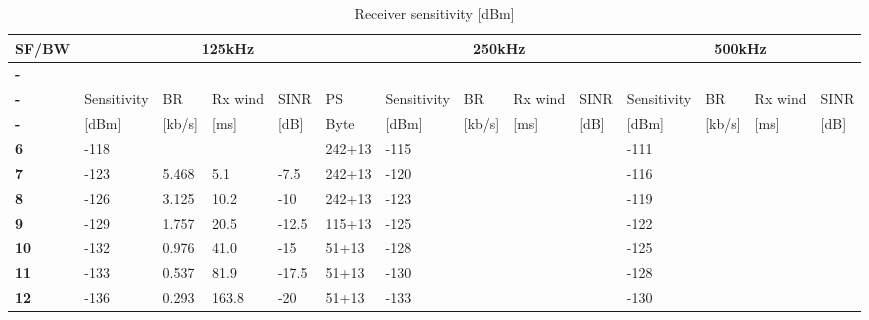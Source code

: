 \begin{table}[h!]
\scriptsize
	\begin{tabular}{l|lllll|llll|llll}
	\textbf{\ac{SF}/\ac{BW}} & \multicolumn{5}{c}{\textbf{125kHz}}                   								& \multicolumn{4}{c}{\textbf{250kHz} }             						& \multicolumn{4}{c}{\textbf{500kHz} }             						 \\\hline
	\textbf{-}     & \cite{varsier_capacity_2017}       & 				  & \cite{loraaliance}	& \cite{lorasite} 	& 			& 			                         & 			 & 			& 			& 			                         & 			 &   		&			 \\
	\textbf{-}     & Sensitivity		                & \ac{BR}		  & Rx wind				& \ac{SINR} 		& \ac{PS}  	& Sensitivity                        & \ac{BR}	 & Rx wind  & \ac{SINR}	& Sensitivity                        & \ac{BR}	 & Rx wind  & \ac{SINR}	 \\
	\textbf{-}     & [dBm]      			            & [kb/s] 		  & [ms]				& [dB] 				& Byte 		& [dBm]      			             & [kb/s] 	 & [ms]		& [dB] 		& [dBm]      			             & [kb/s] 	 & [ms]		& [dB] 		 \\
	\textbf{6}     & -118                               &                 &   					&					& 242+13	& -115                               &           &   		&			& -111                               &           &   		&			 \\
	\textbf{7}     & -123                               & 5.468           & 5.1  				& -7.5				& 242+13	& -120                               &           &   		&			& -116                               &           &   		&			 \\
	\textbf{8}     & -126                               & 3.125           & 10.2  				& -10				& 242+13	& -123                               &           &   		&			& -119                               &           &   		&			 \\
	\textbf{9}     & -129                               & 1.757           & 20.5  				& -12.5				& 115+13	& -125                               &           &   		&			& -122                               &           &   		&			 \\
	\textbf{10}    & -132                               & 0.976           & 41.0  				& -15				& 51+13		& -128                               &           &   		&			& -125                               &           &   		&			 \\
	\textbf{11}    & -133                               & 0.537           & 81.9  				& -17.5				& 51+13		& -130                               &           &   		&			& -128                               &           &   		&			 \\
	\textbf{12}    & -136                               & 0.293           & 163.8  				& -20				& 51+13		& -133                               &           &   		&			& -130                               &           &   		&			 \\\hline
	\end{tabular}
\caption{\label{tab:EE} Receiver sensitivity [dBm]}
\end{table}





